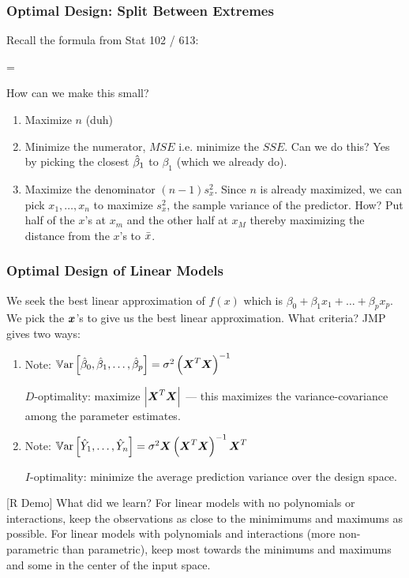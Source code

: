 \documentclass[slides]{beamer} %
\begin{document}
\begin{frame}\frametitle{Optimal Design: Split Between Extremes}

Recall the formula from Stat 102 / 613:

\beqn
{} = 
\eeqn

How can we make this small?

\begin{enumerate}
\item Maximize $n$ (duh)
\item Minimize the numerator, $MSE$ i.e. minimize the $SSE$. Can we do this? Yes by picking the closest $\hat{\beta}_1$ to $\beta_1$ (which we already do). \pause
\item Maximize the denominator $(n-1) s^2_x$. Since $n$ is already maximized, we can pick $x_1, \ldots, x_n$ to maximize $s^2_x$, the sample variance of the predictor.  How? \pause Put half of the $x$'s at $x_m$ and the other half at $x_M$ thereby \pause maximizing the distance from the $x$'s to \pause $\bar{x}$.
\end{enumerate}
	
\end{frame}

\begin{frame}\frametitle{Optimal Design of Linear Models}
\small

We seek the best linear approximation of $f(x)$ which is $\beta_0 + \beta_1 x _1+ \ldots + \beta_p x_p$. We pick the $\boldsymbol{x}$'s to give us the best linear approximation. What criteria? JMP gives two ways:

\begin{enumerate}
\item Note: $\mathbb{V}\text{ar}\left[\hat{\beta}_0, \hat{\beta}_1, \ldots, \hat{\beta}_p\right] = \sigma^2 \left(\boldsymbol{X}^T\boldsymbol{X}\right)^{-1}$ \pause

$D$-optimality: maximize $\left|\boldsymbol{X}^T\boldsymbol{X}\right|$ --- this maximizes the variance-covariance among the parameter estimates. \pause

\item Note: $\mathbb{V}\text{ar}\left[\hat{Y}_1, \ldots, \hat{Y}_n\right] = \sigma^2 \boldsymbol{X}\left(\boldsymbol{X}^T\boldsymbol{X}\right)^{-1}\boldsymbol{X}^T$ \pause

$I$-optimality: minimize the average prediction variance over the design space.
\end{enumerate}

[R Demo] \pause What did we learn? \pause For linear models with no polynomials or interactions, keep the observations as close to the minimimums and maximums as possible. For linear models with polynomials and interactions (more non-parametric than parametric), \pause keep most towards the minimums and maximums and some in the center of the input space.

\end{frame}
\end{document}
